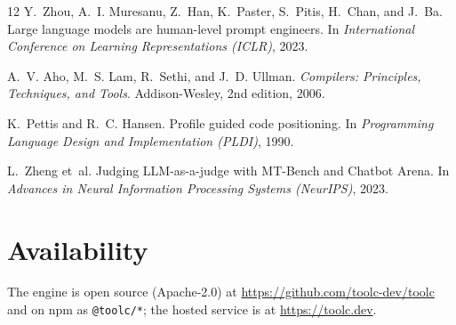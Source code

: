 \documentclass[11pt]{article}
\begin{document}
\begin{thebibliography}{12}
Y.~Zhou, A.~I. Muresanu, Z.~Han, K.~Paster, S.~Pitis, H.~Chan, and J.~Ba.
\newblock Large language models are human-level prompt engineers.
\newblock In \emph{International Conference on Learning Representations (ICLR)}, 2023.

A.~V. Aho, M.~S. Lam, R.~Sethi, and J.~D. Ullman.
\newblock \emph{Compilers: Principles, Techniques, and Tools}.
\newblock Addison-Wesley, 2nd edition, 2006.

K.~Pettis and R.~C. Hansen.
\newblock Profile guided code positioning.
\newblock In \emph{Programming Language Design and Implementation (PLDI)}, 1990.

L.~Zheng et~al.
\newblock Judging LLM-as-a-judge with MT-Bench and Chatbot Arena.
\newblock In \emph{Advances in Neural Information Processing Systems (NeurIPS)}, 2023.

\end{thebibliography}

\section*{Availability}

The engine is open source (Apache-2.0) at
\url{https://github.com/toolc-dev/toolc} and on npm as \texttt{@toolc/*}; the
hosted service is at \url{https://toolc.dev}.
\end{document}
